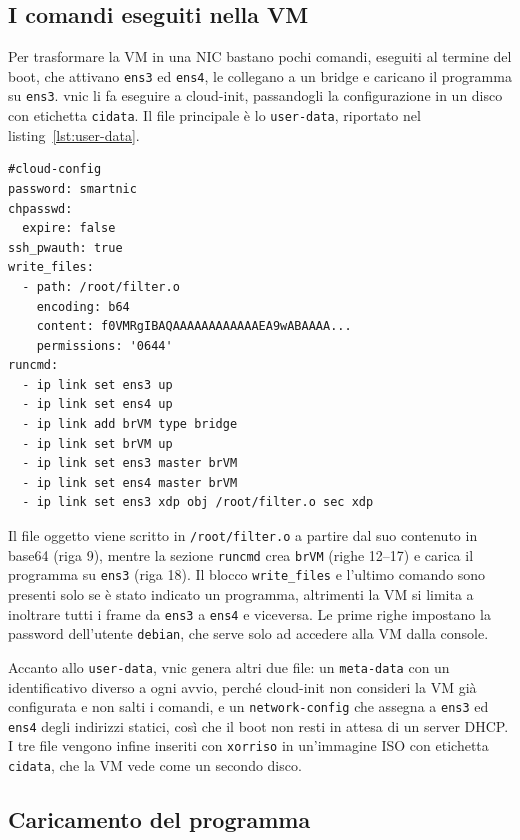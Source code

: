 \subsection{I comandi eseguiti nella VM}\label{sec:comandi-vm}

Per trasformare la VM in una NIC bastano pochi comandi, eseguiti al termine del boot, che attivano \texttt{ens3} ed \texttt{ens4}, le collegano a un bridge e caricano il programma su \texttt{ens3}. vnic li fa eseguire a cloud-init, passandogli la configurazione in un disco con etichetta \texttt{cidata}. Il file principale è lo \texttt{user-data}, riportato nel listing~\ref{lst:user-data}.

\begin{lstlisting}[caption={File \texttt{user-data} generato da vnic (contenuto base64 abbreviato)}, label={lst:user-data}]
#cloud-config
password: smartnic
chpasswd:
  expire: false
ssh_pwauth: true
write_files:
  - path: /root/filter.o
    encoding: b64
    content: f0VMRgIBAQAAAAAAAAAAAAEA9wABAAAA...
    permissions: '0644'
runcmd:
  - ip link set ens3 up
  - ip link set ens4 up
  - ip link add brVM type bridge
  - ip link set brVM up
  - ip link set ens3 master brVM
  - ip link set ens4 master brVM
  - ip link set ens3 xdp obj /root/filter.o sec xdp
\end{lstlisting}

Il file oggetto viene scritto in \texttt{/root/filter.o} a partire dal suo contenuto in base64 (riga 9), mentre la sezione \texttt{runcmd} crea \texttt{brVM} (righe 12--17) e carica il programma su \texttt{ens3} (riga 18). Il blocco \texttt{write\_files} e l'ultimo comando sono presenti solo se è stato indicato un programma, altrimenti la VM si limita a inoltrare tutti i frame da \texttt{ens3} a \texttt{ens4} e viceversa. Le prime righe impostano la password dell'utente \texttt{debian}, che serve solo ad accedere alla VM dalla console.

Accanto allo \texttt{user-data}, vnic genera altri due file: un \texttt{meta-data} con un identificativo diverso a ogni avvio, perché cloud-init non consideri la VM già configurata e non salti i comandi, e un \texttt{network-config} che assegna a \texttt{ens3} ed \texttt{ens4} degli indirizzi statici, così che il boot non resti in attesa di un server DHCP. I tre file vengono infine inseriti con \texttt{xorriso} in un'immagine ISO con etichetta \texttt{cidata}, che la VM vede come un secondo disco.

\subsection{Caricamento del programma}\label{sec:caricamento}

